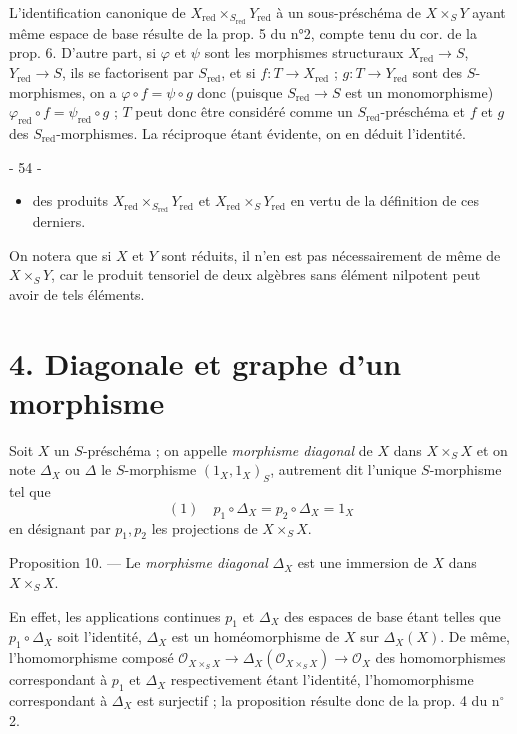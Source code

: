 L'identification canonique de $X_{\text{red}} \times_{S_{\text{red}}} Y_{\text{red}}$ à un sous-préschéma de $X \times_S Y$ ayant même espace de base résulte de la prop. 5 du n°2, compte tenu du cor. de la prop. 6. D'autre part, si $\varphi$ et $\psi$ sont les morphismes structuraux $X_{\text{red}} \to S$, $Y_{\text{red}} \to S$, ils se factorisent par $S_{\text{red}}$, et si $f : T \to X_{\text{red}}$ ; $g : T \to Y_{\text{red}}$ sont des $S$-morphismes, on a $\varphi \circ f = \psi \circ g$ donc (puisque $S_{\text{red}} \to S$ est un monomorphisme) $\varphi_{\text{red}} \circ f = \psi_{\text{red}} \circ g$ ; $T$ peut donc être considéré comme un $S_{\text{red}}$-préschéma et $f$ et $g$ des $S_{\text{red}}$-morphismes. La réciproque étant évidente, on en déduit l'identité.

\newpage


- 54 -

\begin{itemize}
\item des produits $X_{\mathrm{red}} \times_{S_{\mathrm{red}}} Y_{\mathrm{red}}$ et $X_{\mathrm{red}} \times_S Y_{\mathrm{red}}$ en vertu de la définition de ces derniers.
\end{itemize}

On notera que si $X$ et $Y$ sont réduits, il n'en est pas nécessairement de même de $X \times_S Y$, car le produit tensoriel de deux algèbres sans élément nilpotent peut avoir de tels éléments.

\section*{4. Diagonale et graphe d'un morphisme}

Soit $X$ un $S$-préschéma ; on appelle \emph{morphisme diagonal} de $X$ dans $X \times_S X$ et on note $\Delta_X$ ou $\Delta$ le $S$-morphisme $(1_X, 1_X)_S$, autrement dit l'unique $S$-morphisme tel que
$$(1) \quad p_1 \circ \Delta_X = p_2 \circ \Delta_X = 1_X$$
en désignant par $p_1, p_2$ les projections de $X \times_S X$.

Proposition 10. --- Le \emph{morphisme diagonal} $\Delta_X$ est une immersion de $X$ dans $X \times_S X$.

En effet, les applications continues $p_1$ et $\Delta_X$ des espaces de base étant telles que $p_1 \circ \Delta_X$ soit l'identité, $\Delta_X$ est un homéomorphisme de $X$ sur $\Delta_X(X)$. De même, l'homomorphisme composé $\mathcal{O}_{X \times_S X} \to \Delta_X(\mathcal{O}_{X \times_S X}) \to \mathcal{O}_X$ des homomorphismes correspondant à $p_1$ et $\Delta_X$ respectivement étant l'identité, l'homomorphisme correspondant à $\Delta_X$ est surjectif ; la proposition résulte donc de la prop. 4 du n$^\circ$ 2.

